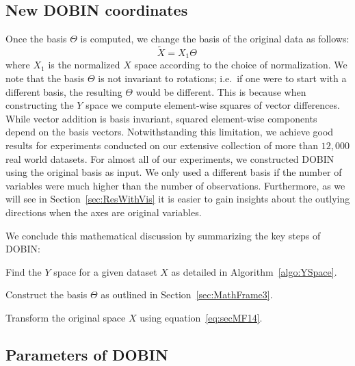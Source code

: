 \documentclass[letter,12pt]{article}
\begin{document}
{\color{blue} 



}




{ \color{blue} \subsection{New DOBIN coordinates} }
Once the basis $\Theta$ is computed, we change the basis of the original data as follows:
\begin{equation}\label{eq:secMF14}
	\tilde{X} = X_1 \Theta \, 
\end{equation}
where $X_1$ is the normalized $X$ space according to the choice of normalization. We note that the basis $\Theta$ is not invariant to rotations; i.e.\ if one were to start with a different basis, the resulting $\Theta$ would be different. This is because when constructing the $Y$ space we compute element-wise squares of vector differences. While vector addition is basis invariant, squared element-wise components depend on the basis vectors. Notwithstanding this limitation, we achieve good results for experiments conducted on our extensive collection of more than $12,000$ real world datasets. For almost all of our experiments, we constructed DOBIN using the original basis as input. We only used a different basis if the number of variables were much higher than the number of observations. %
Furthermore, as we will see in Section~\ref{sec:ResWithVis} it is easier to gain insights about the outlying directions when the axes are original variables.

We conclude this mathematical discussion by summarizing the key steps of DOBIN:
\begin{compactenum}
	\item Find the $Y$ space for a given dataset $X$ as detailed in Algorithm~\ref{algo:YSpace}.
	\item Construct the basis $\Theta$ as outlined in Section~\ref{sec:MathFrame3}.
	\item Transform the original space $X$ using equation~\eqref{eq:secMF14}.
\end{compactenum}


\subsection{Parameters of DOBIN}\label{sec:MathFrame4}
\end{document}
